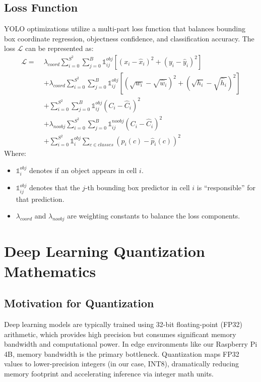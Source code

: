 \subsection{Loss Function}
YOLO optimizations utilize a multi-part loss function that balances bounding box coordinate regression, objectness confidence, and classification accuracy. The loss $\mathcal{L}$ can be represented as:
\begin{equation}
\begin{aligned}
    \mathcal{L} = \;&\lambda_{coord} \sum_{i=0}^{S^2} \sum_{j=0}^{B} \mathbb{1}_{ij}^{obj} \left[ (x_i - \hat{x}_i)^2 + (y_i - \hat{y}_i)^2 \right] \\
    &+ \lambda_{coord} \sum_{i=0}^{S^2} \sum_{j=0}^{B} \mathbb{1}_{ij}^{obj} \left[ (\sqrt{w_i} - \sqrt{\hat{w}_i})^2 + (\sqrt{h_i} - \sqrt{\hat{h}_i})^2 \right] \\
    &+ \sum_{i=0}^{S^2} \sum_{j=0}^{B} \mathbb{1}_{ij}^{obj} (C_i - \hat{C}_i)^2 \\
    &+ \lambda_{noobj} \sum_{i=0}^{S^2} \sum_{j=0}^{B} \mathbb{1}_{ij}^{noobj} (C_i - \hat{C}_i)^2 \\
    &+ \sum_{i=0}^{S^2} \mathbb{1}_{i}^{obj} \sum_{c \in classes} (p_i(c) - \hat{p}_i(c))^2
\end{aligned}
\end{equation}
Where:
\begin{itemize}
    \item $\mathbb{1}_{i}^{obj}$ denotes if an object appears in cell $i$.
    \item $\mathbb{1}_{ij}^{obj}$ denotes that the $j$-th bounding box predictor in cell $i$ is ``responsible'' for that prediction.
    \item $\lambda_{coord}$ and $\lambda_{noobj}$ are weighting constants to balance the loss components.
\end{itemize}

\section{Deep Learning Quantization Mathematics}
\subsection{Motivation for Quantization}
Deep learning models are typically trained using 32-bit floating-point (FP32) arithmetic, which provides high precision but consumes significant memory bandwidth and computational power. In edge environments like our Raspberry Pi 4B, memory bandwidth is the primary bottleneck. Quantization maps FP32 values to lower-precision integers (in our case, INT8), dramatically reducing memory footprint and accelerating inference via integer math units.

